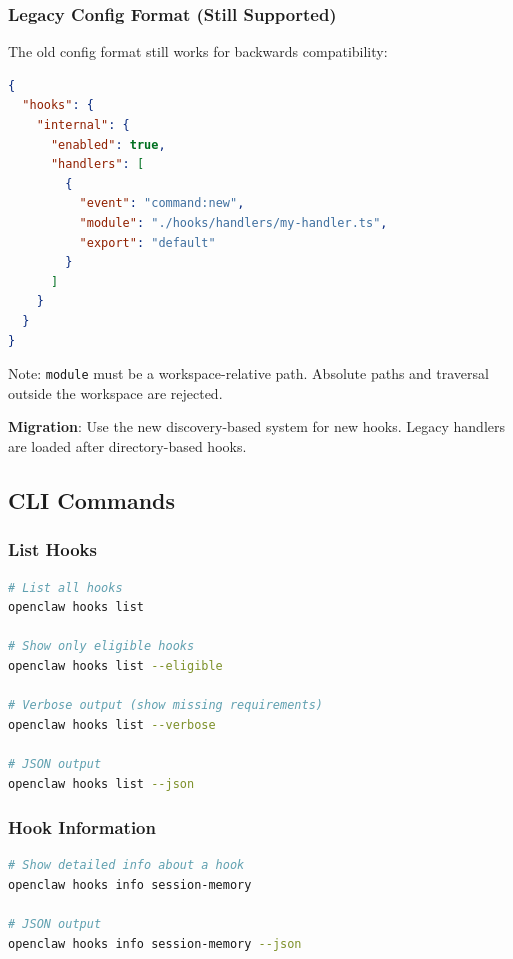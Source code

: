 \subsubsection{Legacy Config Format (Still Supported)}


The old config format still works for backwards compatibility:

\begin{lstlisting}[language=json]
{
  "hooks": {
    "internal": {
      "enabled": true,
      "handlers": [
        {
          "event": "command:new",
          "module": "./hooks/handlers/my-handler.ts",
          "export": "default"
        }
      ]
    }
  }
}
\end{lstlisting}


Note: \texttt{module} must be a workspace-relative path. Absolute paths and traversal outside the workspace are rejected.

\textbf{Migration}: Use the new discovery-based system for new hooks. Legacy handlers are loaded after directory-based hooks.

\subsection{CLI Commands}


\subsubsection{List Hooks}


\begin{lstlisting}[language=bash]
# List all hooks
openclaw hooks list

# Show only eligible hooks
openclaw hooks list --eligible

# Verbose output (show missing requirements)
openclaw hooks list --verbose

# JSON output
openclaw hooks list --json
\end{lstlisting}


\subsubsection{Hook Information}


\begin{lstlisting}[language=bash]
# Show detailed info about a hook
openclaw hooks info session-memory

# JSON output
openclaw hooks info session-memory --json
\end{lstlisting}


